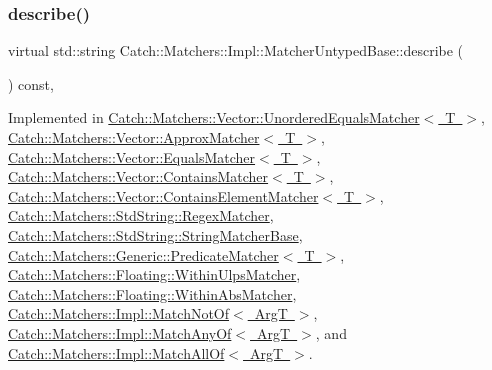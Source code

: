 \subsubsection{\texorpdfstring{describe()}{describe()}}
{\footnotesize\ttfamily virtual std\+::string Catch\+::\+Matchers\+::\+Impl\+::\+Matcher\+Untyped\+Base\+::describe (\begin{DoxyParamCaption}{ }\end{DoxyParamCaption}) const\hspace{0.3cm}{\ttfamily [protected]}, {}}



Implemented in \mbox{\hyperlink{struct_catch_1_1_matchers_1_1_vector_1_1_unordered_equals_matcher_a7202d811200317abc58c844f663823df}{Catch\+::\+Matchers\+::\+Vector\+::\+Unordered\+Equals\+Matcher$<$ T $>$}}, \mbox{\hyperlink{struct_catch_1_1_matchers_1_1_vector_1_1_approx_matcher_a1a9237e24c513c1448fa0624b3e14232}{Catch\+::\+Matchers\+::\+Vector\+::\+Approx\+Matcher$<$ T $>$}}, \mbox{\hyperlink{struct_catch_1_1_matchers_1_1_vector_1_1_equals_matcher_a36b5f7ecada4081d6c65bebe8ddea6f4}{Catch\+::\+Matchers\+::\+Vector\+::\+Equals\+Matcher$<$ T $>$}}, \mbox{\hyperlink{struct_catch_1_1_matchers_1_1_vector_1_1_contains_matcher_abe6a9ea3d6506c9a1f75ff524f35832e}{Catch\+::\+Matchers\+::\+Vector\+::\+Contains\+Matcher$<$ T $>$}}, \mbox{\hyperlink{struct_catch_1_1_matchers_1_1_vector_1_1_contains_element_matcher_aea3b674389a0afd82af6ba4b10f86ae6}{Catch\+::\+Matchers\+::\+Vector\+::\+Contains\+Element\+Matcher$<$ T $>$}}, \mbox{\hyperlink{struct_catch_1_1_matchers_1_1_std_string_1_1_regex_matcher_a1f788cd5258c987e5043f6c7f43adeb9}{Catch\+::\+Matchers\+::\+Std\+String\+::\+Regex\+Matcher}}, \mbox{\hyperlink{struct_catch_1_1_matchers_1_1_std_string_1_1_string_matcher_base_a47af030f8cea42a601ffb1000eea5cca}{Catch\+::\+Matchers\+::\+Std\+String\+::\+String\+Matcher\+Base}}, \mbox{\hyperlink{class_catch_1_1_matchers_1_1_generic_1_1_predicate_matcher_af7d59e94892cc09471bbaefac4c889fd}{Catch\+::\+Matchers\+::\+Generic\+::\+Predicate\+Matcher$<$ T $>$}}, \mbox{\hyperlink{struct_catch_1_1_matchers_1_1_floating_1_1_within_ulps_matcher_ad9bc8bb7f3abd326580a4bf6cf369b1b}{Catch\+::\+Matchers\+::\+Floating\+::\+Within\+Ulps\+Matcher}}, \mbox{\hyperlink{struct_catch_1_1_matchers_1_1_floating_1_1_within_abs_matcher_a206a738680f8767af31d3f1835afff3f}{Catch\+::\+Matchers\+::\+Floating\+::\+Within\+Abs\+Matcher}}, \mbox{\hyperlink{struct_catch_1_1_matchers_1_1_impl_1_1_match_not_of_ac5fb4ef6a9069d23a4098c3c818f06b0}{Catch\+::\+Matchers\+::\+Impl\+::\+Match\+Not\+Of$<$ Arg\+T $>$}}, \mbox{\hyperlink{struct_catch_1_1_matchers_1_1_impl_1_1_match_any_of_a315285204df93d1f8e72f50dd66eb709}{Catch\+::\+Matchers\+::\+Impl\+::\+Match\+Any\+Of$<$ Arg\+T $>$}}, and \mbox{\hyperlink{struct_catch_1_1_matchers_1_1_impl_1_1_match_all_of_acbb9a083e93b546fd33c9235b644c40f}{Catch\+::\+Matchers\+::\+Impl\+::\+Match\+All\+Of$<$ Arg\+T $>$}}.

